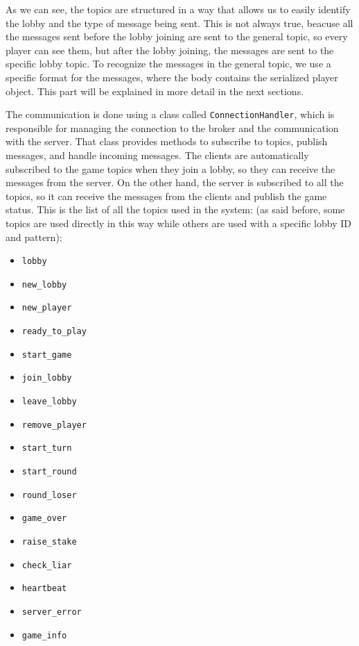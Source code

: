 \documentclass{scrartcl}
\begin{document}
As we can see, the topics are structured in a way that allows us to easily identify the lobby and the type of message being sent. This is not always true, beacuse all the messages sent before the lobby joining are sent to the general topic, so every player can see them, but after the lobby joining, the messages are sent to the specific lobby topic. \newline
To recognize the messages in the general topic, we use a specific format for the messages, where the body contains the serialized player object. This part will be explained in more detail in the next sections. \newline

The communication is done using a class called \texttt{ConnectionHandler}, which is responsible for managing the connection to the broker and the communication with the server. That class provides methods to subscribe to topics, publish messages, and handle incoming messages. \newline
The clients are automatically subscribed to the game topics when they join a lobby, so they can receive the messages from the server. On the other hand, the server is subscribed to all the topics, so it can receive the messages from the clients and publish the game status. \newline
This is the list of all the topics used in the system: (as said before, some topics are used directly in this way while others are used with a specific lobby ID and pattern): 
\begin{itemize}
    \item \texttt{lobby}
    \item \texttt{new\_lobby}
    \item \texttt{new\_player}
    \item \texttt{ready\_to\_play}
    \item \texttt{start\_game}
    \item \texttt{join\_lobby}
    \item \texttt{leave\_lobby}
    \item \texttt{remove\_player}
    \item \texttt{start\_turn}
    \item \texttt{start\_round}
    \item \texttt{round\_loser}
    \item \texttt{game\_over}
    \item \texttt{raise\_stake}
    \item \texttt{check\_liar}
    \item \texttt{heartbeat}
    \item \texttt{server\_error}
    \item \texttt{game\_info}
\end{itemize}
\end{document}
